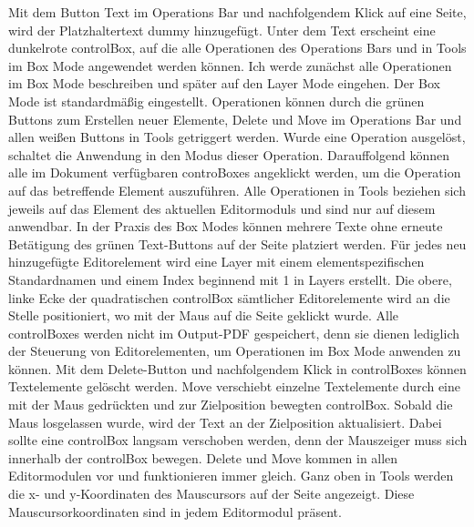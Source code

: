 Mit dem Button Text im Operations Bar und nachfolgendem Klick auf eine Seite, wird der Platzhaltertext dummy hinzugefügt. Unter dem Text erscheint eine dunkelrote controlBox, auf die alle Operationen des Operations Bars und in Tools im Box Mode angewendet werden können. Ich werde zunächst alle Operationen im Box Mode beschreiben und später auf den Layer Mode eingehen. Der Box Mode ist standardmäßig eingestellt. Operationen können durch die grünen Buttons zum Erstellen neuer Elemente, Delete und Move im Operations Bar und allen weißen Buttons in Tools getriggert werden. Wurde eine Operation ausgelöst, schaltet die Anwendung in den Modus dieser Operation. Darauffolgend können alle im Dokument verfügbaren controBoxes angeklickt werden, um die Operation auf das betreffende Element auszuführen. Alle Operationen in Tools beziehen sich jeweils auf das Element des aktuellen Editormoduls und sind nur auf diesem anwendbar. In der Praxis des Box Modes können mehrere Texte ohne erneute Betätigung des grünen Text-Buttons auf der Seite platziert werden. Für jedes neu hinzugefügte Editorelement wird eine Layer mit einem elementspezifischen Standardnamen und einem Index beginnend mit 1 in Layers erstellt. Die obere, linke Ecke der quadratischen controlBox sämtlicher Editorelemente wird an die Stelle positioniert, wo mit der Maus auf die Seite geklickt wurde. Alle controlBoxes werden nicht im Output-PDF gespeichert, denn sie dienen lediglich der Steuerung von Editorelementen, um Operationen im Box Mode anwenden zu können. Mit dem Delete-Button und nachfolgendem Klick in controlBoxes können Textelemente gelöscht werden. Move verschiebt einzelne Textelemente durch eine mit der Maus gedrückten und zur Zielposition bewegten controlBox. Sobald die Maus losgelassen wurde, wird der Text an der Zielposition aktualisiert. Dabei sollte eine controlBox langsam verschoben werden, denn der Mauszeiger muss sich innerhalb der controlBox bewegen. Delete und Move kommen in allen Editormodulen vor und funktionieren immer gleich. Ganz oben in Tools werden die x- und y-Koordinaten des Mauscursors auf der Seite angezeigt. Diese Mauscursorkoordinaten sind in jedem Editormodul präsent. 
\par
